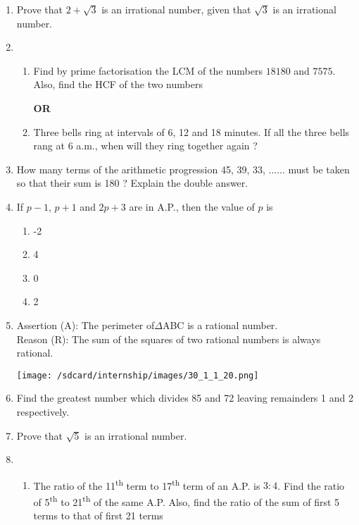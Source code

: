 \documentclass[12pt]{article}
\begin{document}
\begin{enumerate}
    \item Prove that $2+\sqrt{3}$ is an irrational number, given that $\sqrt{3}$ is an irrational number.
    \item\begin{enumerate}[label=(\Alph*)]
        \item Find by prime factorisation the LCM of the numbers $18180$ and $7575$. Also, find the HCF of the two numbers
        \begin{center}
            \textbf{OR}
        \end{center}
        \item Three bells ring at intervals of 6, 12 and 18 minutes. If all the three bells rang at 6 a.m., when will they ring together again ?
        \end{enumerate}
    \item How many terms of the arithmetic progression 45, 39, 33, ...... must be taken so that their sum is 180 ? Explain the double answer.
    \item If $p-1$, $p+1$ and $2p+3$ are in A.P., then the value of $p$ is
        \begin{enumerate}[label=(\alph*)]
      \item -2
      \item 4
      \item 0
      \item 2
      \end{enumerate}
    \item Assertion (A): The perimeter of$\Delta$ABC is a rational number.\\Reason (R): The sum of the squares of two rational numbers is always rational.
    \begin{center}
\texttt{[image: /sdcard/internship/images/30\_1\_1\_20.png]}
     \end{center}
    \item Find the greatest number which divides 85 and 72 leaving remainders 1 and 2 respectively.
    \item Prove that $\sqrt{5}$ is an irrational number.
    \item \begin{enumerate}[label=(\Alph*)]
        \item The ratio of the 11\textsuperscript{th} term to 17\textsuperscript{th} term of an A.P. is $3:4$. Find the ratio of 5\textsuperscript{th} to 21\textsuperscript{th} of the same A.P. Also, find the ratio of the sum of first 5 terms to that of first 21 terms
        \begin{center}

\end{center}
\end{enumerate}
\end{enumerate}
\end{document}
